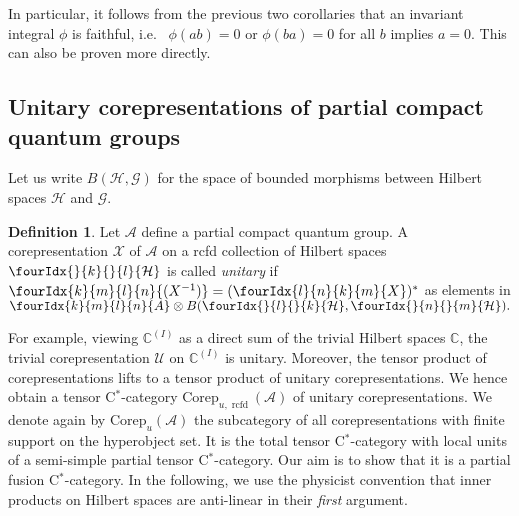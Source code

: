 \documentclass[10pt]{article}
\DeclareMathOperator{\rcf}{\mathrm{rcfd}}
\newcommand{\Corep}{\mathrm{Corep}}
\newcommand{\C}{\mathbb{C}}
\newcommand{\Hsp}{\mathcal{H}}
\newcommand{\Gr}[5]{\fourIdx{#2}{#4}{#3}{#5}{#1}}%
\newcommand{\Gru}[3]{\Gr{#1}{}{}{#2}{#3}}
\theoremstyle{definition}
\newtheorem{Def}[Theorem]{Definition}
\numberwithin{equation}{section}
\begin{document}
In particular, it follows from the previous two corollaries that an invariant integral $\phi$ is faithful, i.e.~ $\phi(ab)=0$ or $\phi(ba)=0$ for all $b$ implies $a=0$. This can also be proven more directly.

\subsection{Unitary corepresentations of partial compact quantum groups}


Let us write $B(\Hsp,\mathcal{G})$ for the space of
bounded morphisms between Hilbert spaces $\Hsp$ and $\mathcal{G}$. 

\begin{Def} Let $\mathscr{A}$ define a partial compact quantum
  group. A corepresentation $\mathscr{X}$ of $\mathscr{A}$ on a rcfd collection of Hilbert spaces $\Gru{\Hsp}{k}{l}$ is called
   \emph{unitary}
  if $\Gr{(X^{-1})}{k}{l}{m}{n}=(\Gr{X}{l}{k}{n}{m})^{*}$ as elements in $\Gr{A}{k}{l}{m}{n}\otimes
  B(\Gru{\Hsp}{l}{k},\Gru{\Hsp}{n}{m}).$
\end{Def} 

For example, viewing $\C^{(I)}$ as a direct sum of the trivial Hilbert spaces $\C$, the
  trivial corepresentation $\mathscr{U}$ on $\C^{(I)}$ is unitary. Moreover, the tensor product of corepresentations lifts to a tensor product
of unitary corepresentations.  We hence obtain a tensor C$^*$-category $\Corep_{u,\rcf}(\mathscr{A})$ of unitary corepresentations. We denote again by $\Corep_u(\mathscr{A})$ the subcategory of all corepresentations with finite support on the hyperobject set. It is the total tensor C$^*$-category with local units of a semi-simple partial tensor C$^*$-category. Our aim is to show that it is a partial fusion C$^*$-category. In the following, we use the physicist convention that inner products on Hilbert spaces are anti-linear in their \emph{first} argument. 
\end{document}
